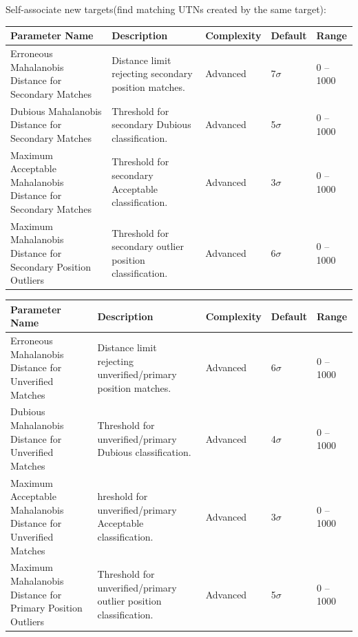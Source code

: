 Self-associate new targets(find matching UTNs created by the same target):
\begin{table}[H]
    \centering
    \footnotesize
    \hspace*{-1.5cm}
    \begin{tabular}{|p{4.5cm}|p{6.5cm}|l|l|l|}
    \hline
    \textbf{Parameter Name} & \textbf{Description} & \textbf{Complexity} & \textbf{Default} & \textbf{Range} \\ \hline
    Erroneous Mahalanobis Distance for Secondary Matches & Distance limit rejecting secondary position matches. & Advanced & 7$\sigma$ & 0 -- 1000 \\ \hline
    Dubious Mahalanobis Distance for Secondary Matches & Threshold for secondary Dubious classification. & Advanced & 5$\sigma$ & 0 -- 1000 \\ \hline
    Maximum Acceptable Mahalanobis Distance for Secondary Matches & Threshold for secondary Acceptable classification. & Advanced & 3$\sigma$ & 0 -- 1000 \\ \hline
    Maximum Mahalanobis Distance for Secondary Position Outliers & Threshold for secondary outlier position classification. & Advanced & 6$\sigma$ & 0 -- 1000 \\ \hline
    \end{tabular}
\end{table}

\begin{table}[H]
    \centering
    \footnotesize
    \hspace*{-1.5cm}
    \begin{tabular}{|p{4.5cm}|p{6.5cm}|l|l|l|}
    \hline
    \textbf{Parameter Name} & \textbf{Description} & \textbf{Complexity} & \textbf{Default} & \textbf{Range} \\ \hline
    Erroneous Mahalanobis Distance for Unverified Matches & Distance limit rejecting unverified/primary position matches. & Advanced & 6$\sigma$ & 0 -- 1000 \\ \hline
    Dubious Mahalanobis Distance for Unverified Matches &Threshold for unverified/primary Dubious classification. & Advanced & 4$\sigma$ & 0 -- 1000 \\ \hline
    Maximum Acceptable Mahalanobis Distance for Unverified Matches & hreshold for unverified/primary Acceptable classification. & Advanced & 3$\sigma$ & 0 -- 1000 \\ \hline
    Maximum Mahalanobis Distance for Primary Position Outliers &  Threshold for unverified/primary outlier position classification. & Advanced & 5$\sigma$ & 0 -- 1000 \\ \hline
    \end{tabular}
\end{table}


